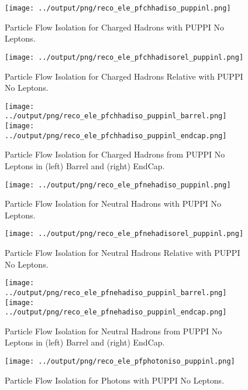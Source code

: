 \documentclass[11pt]{book}
\begin{document}
\begin{figure}[htb]
\centering
\texttt{[image: ../output/png/reco\_ele\_pfchhadiso\_puppinl.png]}
\caption{Particle Flow Isolation for Charged Hadrons with PUPPI No Leptons.}
\label{fig:reco_ele_pfchhadiso_puppinl}
\end{figure}

\begin{figure}[htb]
\centering
\texttt{[image: ../output/png/reco\_ele\_pfchhadisorel\_puppinl.png]}
\caption{Particle Flow Isolation for Charged Hadrons Relative with PUPPI No Leptons.}
\label{fig:reco_ele_pfchhadisorel_puppinl}
\end{figure}

\begin{figure}[ht]
\centering
\texttt{[image: ../output/png/reco\_ele\_pfchhadiso\_puppinl\_barrel.png]}
\texttt{[image: ../output/png/reco\_ele\_pfchhadiso\_puppinl\_endcap.png]}
\caption{Particle Flow Isolation for Charged Hadrons from PUPPI No Leptons in (left) Barrel and (right) EndCap.}
\label{fig:reco_ele_pfchhadiso_puppinl_regions}
\end{figure}

\begin{figure}[htb]
\centering
\texttt{[image: ../output/png/reco\_ele\_pfnehadiso\_puppinl.png]}
\caption{Particle Flow Isolation for Neutral Hadrons with PUPPI No Leptons.}
\label{fig:reco_ele_pfnehadiso_puppinl}
\end{figure}

\begin{figure}[htb]
\centering
\texttt{[image: ../output/png/reco\_ele\_pfnehadisorel\_puppinl.png]}
\caption{Particle Flow Isolation for Neutral Hadrons Relative with PUPPI No Leptons.}
\label{fig:reco_ele_pfnehadisorel_puppinl}
\end{figure}

\begin{figure}[ht]
\centering
\texttt{[image: ../output/png/reco\_ele\_pfnehadiso\_puppinl\_barrel.png]}
\texttt{[image: ../output/png/reco\_ele\_pfnehadiso\_puppinl\_endcap.png]}
\caption{Particle Flow Isolation for Neutral Hadrons from PUPPI No Leptons in (left) Barrel and (right) EndCap.}
\label{fig:reco_ele_pfnehadiso_puppinl_regions}
\end{figure}

\begin{figure}[htb]
\centering
\texttt{[image: ../output/png/reco\_ele\_pfphotoniso\_puppinl.png]}
\caption{Particle Flow Isolation for Photons with PUPPI No Leptons.}
\label{fig:reco_ele_pfphotoniso_puppinl}
\end{figure}
\end{document}
